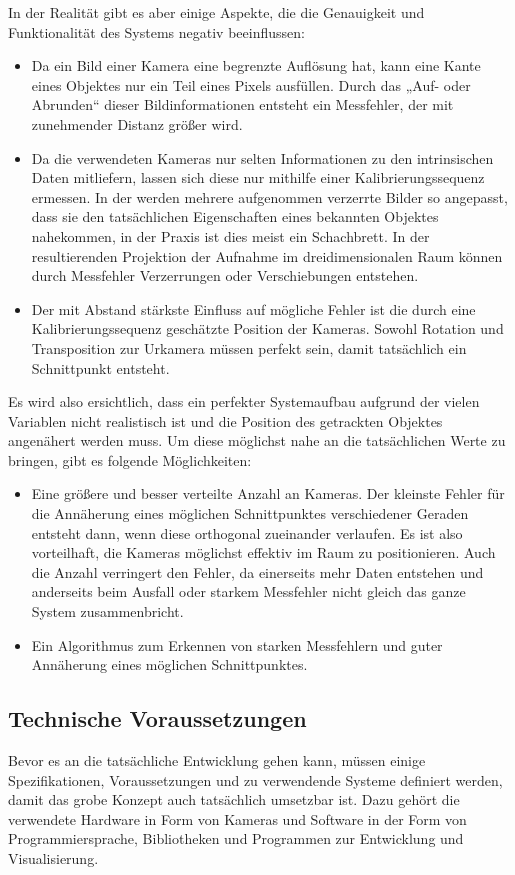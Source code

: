 \documentclass[12pt, ngerman]{article}
\begin{document}
In der Realität gibt es aber einige Aspekte, die die Genauigkeit und Funktionalität des Systems negativ beeinflussen: 
\begin{itemize}
  \item Da ein Bild einer Kamera eine begrenzte Auflösung hat, kann eine Kante eines Objektes nur ein Teil eines Pixels ausfüllen. Durch das „Auf- oder Abrunden“ dieser Bildinformationen entsteht ein Messfehler, der mit zunehmender Distanz größer wird. 
  \item Da die verwendeten Kameras  nur selten Informationen zu den intrinsischen Daten mitliefern, lassen sich diese nur mithilfe einer Kalibrierungssequenz ermessen. In der werden mehrere aufgenommen verzerrte Bilder so angepasst, dass sie den tatsächlichen Eigenschaften eines bekannten Objektes nahekommen, in der Praxis ist dies meist ein Schachbrett. In der resultierenden Projektion der Aufnahme im dreidimensionalen Raum können durch Messfehler Verzerrungen oder Verschiebungen entstehen. 
  \item Der mit Abstand stärkste Einfluss auf mögliche Fehler ist die durch eine Kalibrierungssequenz geschätzte Position der Kameras. Sowohl Rotation und Transposition zur Urkamera müssen perfekt sein, damit tatsächlich ein Schnittpunkt entsteht. 
\end{itemize}

Es wird also ersichtlich, dass ein perfekter Systemaufbau aufgrund der vielen Variablen nicht realistisch ist und die Position des getrackten Objektes angenähert werden muss. Um diese möglichst nahe an die tatsächlichen Werte zu bringen, gibt es folgende Möglichkeiten: 
\begin{itemize}
  \item Eine größere und besser verteilte Anzahl an Kameras. Der kleinste Fehler für die Annäherung eines möglichen Schnittpunktes verschiedener Geraden entsteht dann, wenn diese orthogonal zueinander verlaufen. Es ist also vorteilhaft, die Kameras möglichst effektiv im Raum zu positionieren. Auch die Anzahl verringert den Fehler, da einerseits mehr Daten entstehen und anderseits beim Ausfall oder starkem Messfehler nicht gleich das ganze System zusammenbricht. 
  \item Ein Algorithmus zum Erkennen von starken Messfehlern und guter Annäherung eines möglichen Schnittpunktes. 
\end{itemize}

\subsection{Technische Voraussetzungen}
Bevor es an die tatsächliche Entwicklung gehen kann, müssen einige Spezifikationen, Voraussetzungen und zu verwendende Systeme definiert werden, damit das grobe Konzept auch tatsächlich umsetzbar ist. Dazu gehört die verwendete Hardware in Form von Kameras und Software in der Form von Programmiersprache, Bibliotheken und Programmen zur Entwicklung und Visualisierung. 
\end{document}
